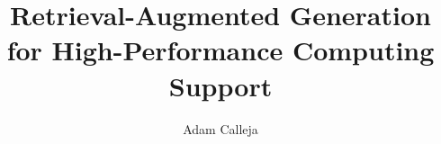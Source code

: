 \documentclass[12pt,Bsc,wordcount,twoside,anon]{muthesis}
\begin{document}

\title{Retrieval-Augmented Generation for High-Performance Computing Support}
\author{Adam Calleja}

\beforeabstract





\afterabstract


\afterpreface














\appendix



\end{document}
